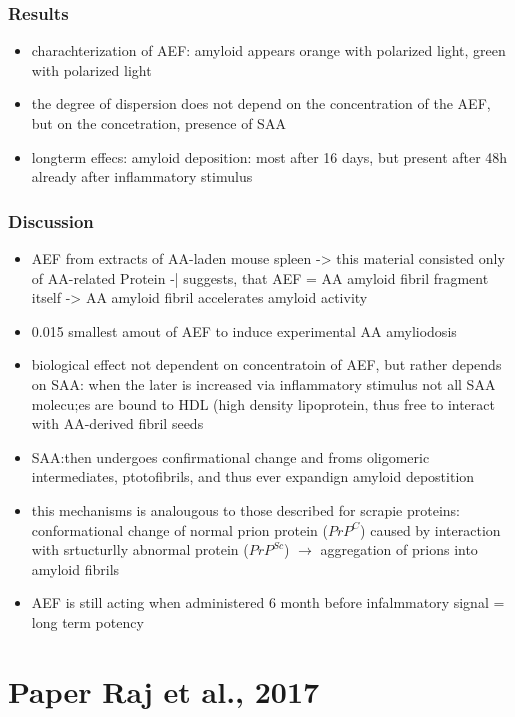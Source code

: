 \documentclass[fleqn]{article}\usepackage{caption}
\begin{document}
\subsubsection{Results}
\begin{itemize}
\item charachterization of AEF: amyloid appears orange with polarized light, green with polarized light
\item the degree of dispersion does not depend on the concentration of the AEF, but on the concetration, presence of SAA
\item longterm effecs: amyloid deposition: most after 16 days, but present after 48h already after inflammatory stimulus
\end{itemize}

\subsubsection{Discussion}
\begin{itemize}
\item AEF from extracts of AA-laden mouse spleen -> this material consisted only of AA-related Protein -| suggests, that AEF = AA amyloid fibril fragment itself -> AA amyloid fibril accelerates amyloid activity
\item 0.015 smallest amout of AEF to induce experimental AA amyliodosis
\item biological effect not dependent on concentratoin of AEF, but rather depends on SAA: when the later is increased via inflammatory stimulus not all SAA molecu;es are bound to HDL (high density lipoprotein, thus free to interact with AA-derived fibril seeds
\item SAA:then undergoes confirmational change and froms oligomeric intermediates, ptotofibrils, and thus ever expandign amyloid depostition 
\item this mechanisms is analougous to those described for scrapie proteins: conformational change of normal prion protein ($PrP^C$) caused by interaction with srtucturlly abnormal protein ($PrP^{Sc}$) $\rightarrow$  aggregation of prions into amyloid fibrils
\item AEF is still acting when administered 6 month before infalmmatory signal = long term potency
\end{itemize}


\section{Paper Raj et al., 2017}
\end{document}

